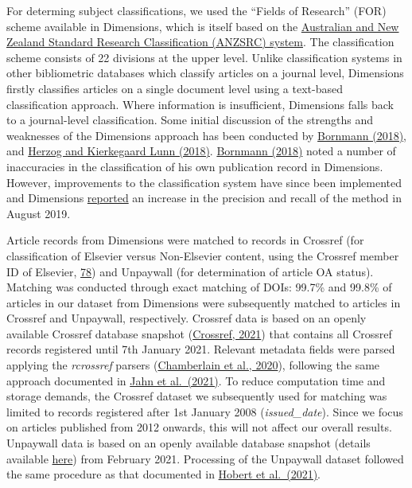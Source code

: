 \documentclass[
]{article}
\begin{document}
For determing subject classifications, we used the ``Fields of Research'' (FOR) scheme available in Dimensions, which is itself based on the \href{https://dimensions.freshdesk.com/support/solutions/articles/23000018826-what-is-the-background-behind-the-fields-of-research-for-classification-system-}{Australian and New Zealand Standard Research Classification (ANZSRC) system}. The classification scheme consists of 22 divisions at the upper level. Unlike classification systems in other bibliometric databases which classify articles on a journal level, Dimensions firstly classifies articles on a single document level using a text-based classification approach. Where information is insufficient, Dimensions falls back to a journal-level classification. Some initial discussion of the strengths and weaknesses of the Dimensions approach has been conducted by \href{https://doi.org/10.1007/s11192-018-2855-y}{Bornmann (2018)}, and \href{https://doi.org/10.1007/s11192-018-2854-z}{Herzog and Kierkegaard Lunn (2018)}. \href{https://doi.org/10.1007/s11192-018-2855-y}{Bornmann (2018)} noted a number of inaccuracies in the classification of his own publication record in Dimensions. However, improvements to the classification system have since been implemented and Dimensions \href{https://www.dimensions.ai/release-notes/}{reported} an increase in the precision and recall of the method in August 2019.

Article records from Dimensions were matched to records in Crossref (for classification of Elsevier versus Non-Elsevier content, using the Crossref member ID of Elsevier, \href{https://www.crossref.org/members/prep/78}{78}) and Unpaywall (for determination of article OA status). Matching was conducted through exact matching of DOIs: 99.7\% and 99.8\% of articles in our dataset from Dimensions were subsequently matched to articles in Crossref and Unpaywall, respectively. Crossref data is based on an openly available Crossref database snapshot (\href{https://academictorrents.com/details/e4287cb7619999709f6e9db5c359dda17e93d515}{Crossref, 2021}) that contains all Crossref records registered until 7th January 2021. Relevant metadata fields were parsed applying the \emph{rcrossref} parsers (\href{https://CRAN.R-project.org/package=rcrossref}{Chamberlain et al., 2020}), following the same approach documented in \href{https://arxiv.org/abs/2102.04789}{Jahn et al.~(2021)}. To reduce computation time and storage demands, the Crossref dataset we subsequently used for matching was limited to records registered after 1st January 2008 (\emph{issued\_date}). Since we focus on articles published from 2012 onwards, this will not affect our overall results. Unpaywall data is based on an openly available database snapshot (details available \href{https://unpaywall.org/products/snapshot}{here}) from February 2021. Processing of the Unpaywall dataset followed the same procedure as that documented in \href{https://edoc.hu-berlin.de/handle/18452/23336}{Hobert et al.~(2021)}.
\end{document}
